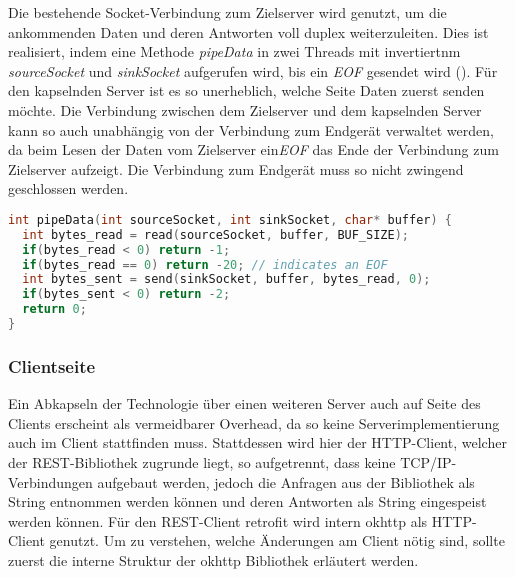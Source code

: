         Die bestehende Socket-Verbindung zum Zielserver wird genutzt, um die ankommenden Daten und deren Antworten voll duplex weiterzuleiten. Dies ist realisiert, indem eine Methode {\it pipeData} in zwei Threads mit invertiertnm {\it sourceSocket} und {\it sinkSocket} aufgerufen wird, bis ein {\it EOF} gesendet wird (). Für den kapselnden Server ist es so unerheblich, welche Seite Daten zuerst senden möchte. Die Verbindung zwischen dem Zielserver und dem kapselnden Server kann so auch unabhängig von der Verbindung zum Endgerät verwaltet werden, da beim Lesen der Daten vom Zielserver ein{\it EOF} das Ende der Verbindung zum Zielserver aufzeigt. Die Verbindung zum Endgerät muss so nicht zwingend geschlossen werden.
        
        \begin{lstlisting}[frame=bt, label={lst:socket:data}, language=C, caption=Datenweiterleitung durch Sockets (Servercode in C)] 
int pipeData(int sourceSocket, int sinkSocket, char* buffer) {
  int bytes_read = read(sourceSocket, buffer, BUF_SIZE);
  if(bytes_read < 0) return -1;
  if(bytes_read == 0) return -20; // indicates an EOF
  int bytes_sent = send(sinkSocket, buffer, bytes_read, 0);
  if(bytes_sent < 0) return -2;
  return 0;
}
        \end{lstlisting}        
        
        \subsubsection{Clientseite}
        Ein Abkapseln der Technologie über einen weiteren Server auch auf Seite des Clients erscheint als vermeidbarer Overhead, da so keine Serverimplementierung auch im Client stattfinden muss. Stattdessen wird hier der HTTP-Client, welcher der REST-Bibliothek zugrunde liegt, so aufgetrennt, dass keine TCP/IP-Verbindungen aufgebaut werden, jedoch die Anfragen aus der Bibliothek als String entnommen werden können und  deren Antworten als String eingespeist werden können. Für den REST-Client retrofit wird intern okhttp als HTTP-Client genutzt. Um zu verstehen, welche Änderungen am Client nötig sind, sollte zuerst die interne Struktur der okhttp Bibliothek erläutert werden.
        
